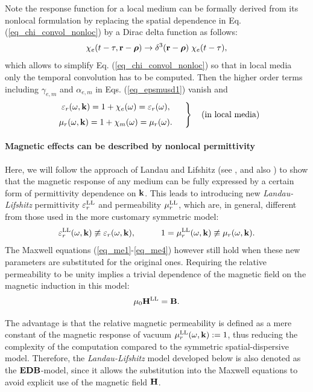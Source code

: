 Note the response function for a local medium can be formally derived from its nonlocal formulation by replacing the spatial dependence in Eq. (\ref{eq_chi_convol_nonloc}) by a Dirac delta function as follows: %
\begin{equation} \chi_e(t-\tau, {\mathbf{r}}-\boldsymbol{\rho}) \rightarrow \delta^{3}({\mathbf{r}}-\boldsymbol{\rho}) \; \chi_e(t-\tau), \label{eq_loc_chi}\end{equation}
which allows to simplify Eq. (\ref{eq_chi_convol_nonloc}) so that in local media only the temporal convolution has to be computed. Then the higher order terms including $\gamma_{e,m}$ and $\alpha_{e,m}$ in Eqs. (\ref{eq_epsmusd1}) vanish and
\begin{equation} 
\left.  \begin{array}{c}
\epsrn(\omega,\kk) = 1 + \chi_e(\omega) = \epsrl(\omega), \medskip \\
\murn(\omega,\kk) = 1 + \chi_m(\omega) = \murl(\omega). 
\end{array} \quad \right\} \quad \text{(in local media)}
\label{eq_epsmusd2}\end{equation}

\paragraph{Magnetic effects can be described by nonlocal permittivity} %
Here, we will follow the approach of Landau and Lifshitz (see \cite{landau1984electrodynamics}, and also \cite{krowne2007book_agran, agranovich2006spatial}) to show that the magnetic response of any medium can be fully expressed by a certain form of permittivity dependence on ${\mathbf{k}}$. This leads to introducing new \textit{Landau-Lifshitz} permittivity $\varepsilon_r^\text{LL}$ and permeability $\mu_r^\text{LL}$, which are, in general, different from those used in the more customary symmetric model:
$$\varepsilon_r^\text{LL}(\omega, {\mathbf{k}}) \not\equiv \varepsilon_r(\omega, {\mathbf{k}}),\quad\quad\quad 1 = \mu_r^\text{LL}(\omega, {\mathbf{k}}) \not\equiv \mu_r(\omega, {\mathbf{k}}).$$
The Maxwell equations (\ref{eq_me1}-\ref{eq_me4}) however still hold when these new parameters are substituted for the original ones. Requiring the relative permeability to be unity implies a trivial dependence of the magnetic field on the magnetic induction in this model:
$$ \mu_0 {\mathbf{H}^\text{LL}} = \mathbf{B}. $$

The advantage is that the relative magnetic permeability is defined as a mere constant of the magnetic response of vacuum $\mu_r^\text{LL}(\omega, {\mathbf{k}}) := 1$, thus reducing the complexity of the computation compared to the symmetric spatial-dispersive model. %
Therefore, the \textit{Landau-Lifshitz} model developed below is also denoted as the $\mathbf{E}\mathbf{D}\mathbf{B}$-model, since it allows the substitution into the Maxwell equations to avoid explicit use of the magnetic field $\mathbf{H}$.

